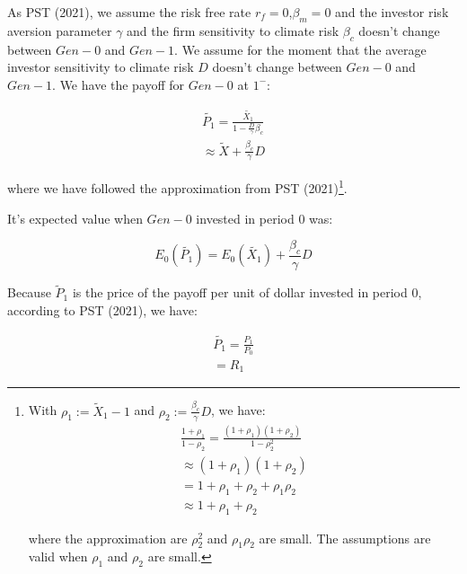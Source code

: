 As PST (2021), we assume the 
risk free rate $r_f = 0$,$\beta_m = 0$ and the investor 
risk aversion parameter $\gamma$ and the 
firm sensitivity to climate risk $\beta_{c}$
doesn't change between $Gen-0$ and $Gen-1$.
We assume for the moment that the average 
investor sensitivity to climate risk $D$ 
doesn't change between $Gen-0$ and $Gen-1$.
We have the payoff for $Gen-0$ at $1^{-}$:

\begin{equation}
    \begin{aligned}
    \tilde{P_1} = \frac{\tilde{X_1}}{1 - \frac{D}{\gamma} \beta_{c}} \\
    \approx \tilde{X} + \frac{\beta_{c}}{\gamma}D
    \end{aligned}
\end{equation}

where we have followed the approximation
from PST (2021)\footnote{
With $\rho_1 := \tilde{X}_1 - 1$ and $\rho_2 := \frac{\beta_{c}}{\gamma}D$,
we have:
\begin{equation}
    \begin{aligned}
        \frac{1 + \rho_1}{1 - \rho_2} = \frac{(1 + \rho_1)(1 + \rho_2)}{1 - \rho_2^2} \\
        \approx (1 + \rho_1)(1 + \rho_2) \\
        = 1 + \rho_1 + \rho_2 + \rho_1 \rho_2 \\
        \approx 1 + \rho_1 + \rho_2
    \end{aligned}
\end{equation}

where the approximation are $\rho^2_2$ and $\rho_1 \rho_2$ are small.
The assumptions are valid when $\rho_1$ and $\rho_2$ are small.
}.

It's expected value when $Gen-0$ invested in period 0 was:

\begin{equation}
    E_0(\tilde{P_1}) = E_0(\tilde{X_1}) + \frac{\beta_{c}}{\gamma}D
\end{equation}

Because $\tilde{P}_1$ is the price of the payoff 
per unit of dollar invested in period 0,
according to PST (2021), we have:

\begin{equation}
    \begin{aligned}
    \tilde{P_1} = \frac{P_1}{P_0} \\
    = R_1
    \end{aligned}
\end{equation}

